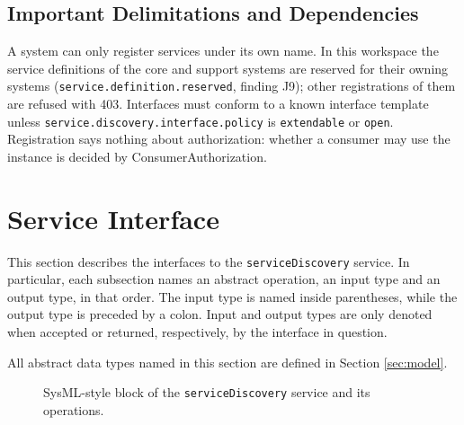 \documentclass[a4paper]{arrowhead}
\begin{document}
\subsection{Important Delimitations and Dependencies}
\label{sec:delimitations}

A system can only register services under its own name. In this workspace the service definitions of the core and support systems are reserved for their owning systems (\texttt{service.\allowbreak{}definition.\allowbreak{}reserved}, finding J9); other registrations of them are refused with 403. Interfaces must conform to a known interface template unless \texttt{service.\allowbreak{}discovery.\allowbreak{}interface.\allowbreak{}policy} is \texttt{extendable} or \texttt{open}. Registration says nothing about authorization: whether a consumer may use the instance is decided by Consumer\allowbreak{}Authorization.

\newpage

\section{Service Interface}
\label{sec:operations}

This section describes the interfaces to the \texttt{serviceDiscovery} service.
In particular, each subsection names an abstract operation, an input type and an output type, in that order.
The input type is named inside parentheses, while the output type is preceded by a colon.
Input and output types are only denoted when accepted or returned, respectively, by the interface in question.

All abstract data types named in this section are defined in Section \ref{sec:model}.

\begin{figure}[ht!]
  \centering
  \caption{SysML-style block of the \texttt{serviceDiscovery} service and its operations.}
  \label{fig:SD}
\end{figure}
\end{document}
